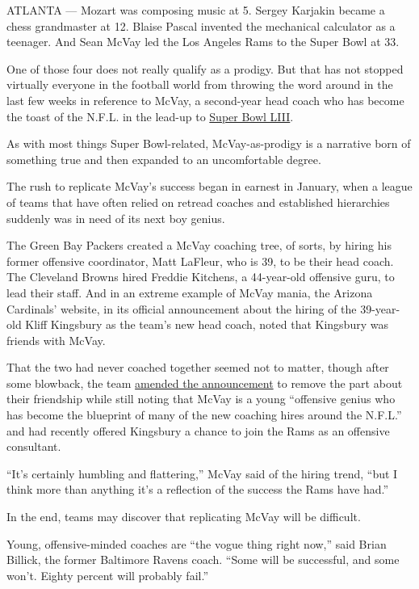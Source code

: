 ATLANTA --- Mozart was composing music at 5. Sergey Karjakin became a
chess grandmaster at 12. Blaise Pascal invented the mechanical
calculator as a teenager. And Sean McVay led the Los Angeles Rams to the
Super Bowl at 33.

One of those four does not really qualify as a prodigy. But that has not
stopped virtually everyone in the football world from throwing the word
around in the last few weeks in reference to McVay, a second-year head
coach who has become the toast of the N.F.L. in the lead-up to
\href{https://www.nytimes3xbfgragh.onion/2019/02/01/sports/tom-brady-patriots.html?action=click\&module=Top+Stories\&pgtype=Homepage}{Super
Bowl LIII}.

As with most things Super Bowl-related, McVay-as-prodigy is a narrative
born of something true and then expanded to an uncomfortable degree.

The rush to replicate McVay's success began in earnest in January, when
a league of teams that have often relied on retread coaches and
established hierarchies suddenly was in need of its next boy genius.

The Green Bay Packers created a McVay coaching tree, of sorts, by hiring
his former offensive coordinator, Matt LaFleur, who is 39, to be their
head coach. The Cleveland Browns hired Freddie Kitchens, a 44-year-old
offensive guru, to lead their staff. And in an extreme example of McVay
mania, the Arizona Cardinals' website, in its official announcement
about the hiring of the 39-year-old Kliff Kingsbury as the team's new
head coach, noted that Kingsbury was friends with McVay.

That the two had never coached together seemed not to matter, though
after some blowback, the team
\href{https://www.azcardinals.com/news/cardinals-hire-kliff-kingsbury-as-head-coach}{amended
the announcement} to remove the part about their friendship while still
noting that McVay is a young ``offensive genius who has become the
blueprint of many of the new coaching hires around the N.F.L.'' and had
recently offered Kingsbury a chance to join the Rams as an offensive
consultant.

``It's certainly humbling and flattering,'' McVay said of the hiring
trend, ``but I think more than anything it's a reflection of the success
the Rams have had.''

In the end, teams may discover that replicating McVay will be difficult.

Young, offensive-minded coaches are ``the vogue thing right now,'' said
Brian Billick, the former Baltimore Ravens coach. ``Some will be
successful, and some won't. Eighty percent will probably fail.''

